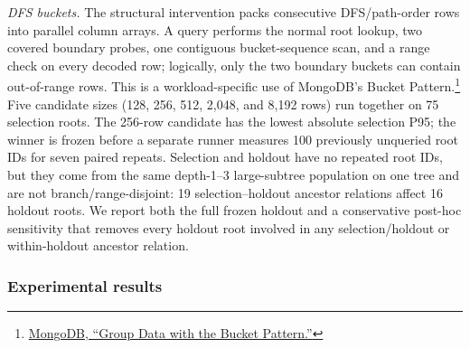 \documentclass[10pt]{article}
\begin{document}
\textit{DFS buckets.} The structural intervention packs consecutive
DFS/path-order rows into parallel column arrays. A query performs the normal
root lookup, two covered boundary probes, one contiguous bucket-sequence scan,
and a range check on every decoded row; logically, only the two boundary
buckets can contain out-of-range rows. This is a workload-specific use of
MongoDB's Bucket Pattern.\footnote{\href{https://www.mongodb.com/docs/manual/data-modeling/design-patterns/group-data/bucket-pattern/}{MongoDB,
``Group Data with the Bucket Pattern.''}} Five candidate sizes
(128, 256, 512, 2{,}048, and 8{,}192 rows) run together on 75 selection roots.
The 256-row candidate has the lowest absolute selection P95; the winner is
frozen before a separate runner measures 100 previously unqueried root IDs for
seven paired repeats. Selection and holdout have no repeated root IDs, but they
come from the same depth-1--3 large-subtree population on one tree and are not
branch/range-disjoint: 19 selection--holdout ancestor relations affect 16
holdout roots. We report both the full frozen holdout and a conservative
post-hoc sensitivity that removes every holdout root involved in any
selection/holdout or within-holdout ancestor relation.

\Needspace{0.55\textheight}
\subsubsection{Experimental results}
\end{document}
